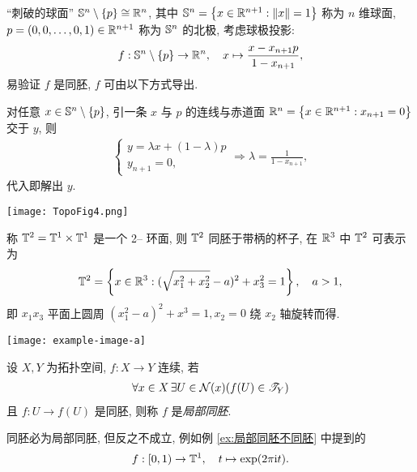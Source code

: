     \begin{Example}
        ``刺破的球面'' $ \S^{n}\sm\set{p}\cong\R^{n} $, 其中 $ \S^{n}=\set{x\in\R^{n+1}:\norm{x}=1} $ 称为 $ n $ 维球面, $ p=(0, 0, \dots, 0, 1)\in \R^{n+1} $ 称为 $ \S^{n} $ 的北极, 考虑球极投影:
        \begin{align*}
            f: \S^{n}\sm\set{p}\to \R^{n}, \quad x\mapsto \frac{x-x_{n+1}p}{1-x_{n+1}},
        \end{align*}
        易验证 $ f $ 是同胚, $ f $ 可由以下方式导出. 

        对任意 $ x\in\S^{n}\sm\set{p} $, 引一条 $ x $ 与 $ p $ 的连线与赤道面 $ \R^{n}=\set{x\in\R^{n+1}: x_{n+1}=0} $ 交于 $ y $, 则
        \begin{align*}
            \begin{cases}
                y=\lambda x+(1-\lambda)p \\
                y_{n+1}=0,
            \end{cases}
            \Longrightarrow \lambda=\frac{1}{1-x_{n+1}},
        \end{align*}
        代入即解出 $ y $.
        \begin{center}
            \texttt{[image: TopoFig4.png]}
        \end{center}
    \end{Example}
    
    \begin{Example}
        称 $ \T^{2}=\T^{1}\times\T^{1} $ 是一个 2-- 环面, 则 $ \T^{2} $ 同胚于带柄的杯子, 在 $ \R^{3} $ 中 $ \T^{2} $ 可表示为
        \begin{align*}
            \T^{2}=\set{x\in\R^{3}:(\sqrt{x_{1}^{2}+x_{2}^{2}}-a)^{2}+x_{3}^{2}=1},\quad a>1,
        \end{align*}
        即 $ x_{1}x_{3} $ 平面上圆周 $ (x_{1}^{2}-a)^{2}+x^{3}=1, x_{2}=0 $ 绕 $ x_{2} $ 轴旋转而得.
        \begin{center}
            \texttt{[image: example-image-a]}
        \end{center}
    \end{Example}

    \begin{Definition}[局部同胚]
        设 $ X, Y $ 为拓扑空间, $ f: X\to Y $ 连续, 若
        \begin{align*}
            \forall x\in X\,\exists U\in\CN(x)(f(U)\in\ST_{Y})
        \end{align*}
        且 $ f:U\to f(U) $ 是同胚, 则称 $ f $ 是\emph{局部同胚}.
    \end{Definition}
    同胚必为局部同胚, 但反之不成立, 例如例 \ref{ex:局部同胚不同胚} 中提到的
    \begin{align*}
        f: [0, 1)\to \T^{1},\quad t\mapsto \exp(2\pi \imag t).
    \end{align*}


